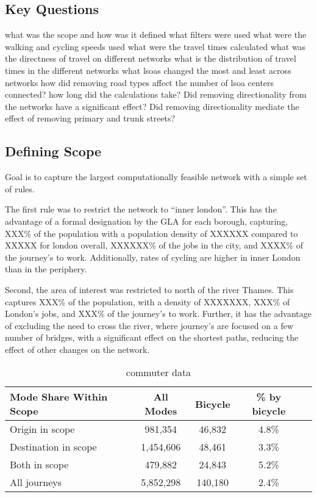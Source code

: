 
\subsection{Key Questions}
what was the scope and how was it defined
what filters were used
what were the walking and cycling speeds used
what were the travel times calculated
what was the directness of travel on different networks
what is the distribution of travel times in the different networks
what lsoas changed the most and least across networks
how did removing road types affect the number of lsoa centers connected?
how long did the calculations take?
Did removing directionality from the networks have a significant effect?
Did removing directionality mediate the effect of removing primary and trunk streets?



\subsection{Defining Scope}


Goal is to capture the largest computationally feasible network with a simple set of rules. 

The first rule was to restrict the network to ``inner london''. This has the advantage of a formal designation by the GLA for each borough, capturing, XXX\% of the population with a population density of XXXXXX compared to XXXXX for london overall, XXXXXX\% of the jobs in the city, and XXXX\% of the journey's to work. Additionally, rates of cycling are higher in inner London than in the periphery. 

Second, the area of interest was restricted to north of the river Thames. This captures XXX\% of the population, with a density of XXXXXXX, XXX\% of London's jobs, and XXX\% of the journey's to work. Further, it has the advantage of excluding the need to cross the river, where journey's are focused on a few number of bridges, with a significant effect on the shortest paths, reducing the effect of other changes on the network. 

\begin{table}[]
\centering
\begin{tabular}{lcccl}
 Mode Share Within Scope & All Modes & Bicycle & \% by bicycle &  \\
 \hline
 Origin in scope &  981,354 & 46,832 & 4.8\% &  \\
 Destination in scope & 1,454,606 & 48,461 & 3.3\% &  \\
 Both in scope & 479,882 & 24,843 & 5.2\% & \\
 All journeys & 5,852,298 & 140,180 & 2.4\% \\ 
\end{tabular}
\caption{commuter data}
\label{table:commute_data}
\end{table}

